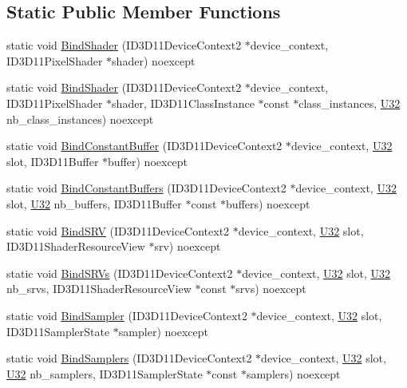 \subsection*{Static Public Member Functions}
\begin{DoxyCompactItemize}
\item 
static void \hyperlink{structmage_1_1_pipeline_1_1_p_s_acd52254650845fa7764bd885b057f911}{Bind\+Shader} (I\+D3\+D11\+Device\+Context2 $\ast$device\+\_\+context, I\+D3\+D11\+Pixel\+Shader $\ast$shader) noexcept
\item 
static void \hyperlink{structmage_1_1_pipeline_1_1_p_s_a7041e2df09132fc997693cd1dc8d02f7}{Bind\+Shader} (I\+D3\+D11\+Device\+Context2 $\ast$device\+\_\+context, I\+D3\+D11\+Pixel\+Shader $\ast$shader, I\+D3\+D11\+Class\+Instance $\ast$const $\ast$class\+\_\+instances, \hyperlink{namespacemage_a41c104c036fba3756a74e19f793eeaa1}{U32} nb\+\_\+class\+\_\+instances) noexcept
\item 
static void \hyperlink{structmage_1_1_pipeline_1_1_p_s_a111b5788abda87b66c81a1dfb6a1cad3}{Bind\+Constant\+Buffer} (I\+D3\+D11\+Device\+Context2 $\ast$device\+\_\+context, \hyperlink{namespacemage_a41c104c036fba3756a74e19f793eeaa1}{U32} slot, I\+D3\+D11\+Buffer $\ast$buffer) noexcept
\item 
static void \hyperlink{structmage_1_1_pipeline_1_1_p_s_aa3a8689b37e565f9796f1a17c3c7917a}{Bind\+Constant\+Buffers} (I\+D3\+D11\+Device\+Context2 $\ast$device\+\_\+context, \hyperlink{namespacemage_a41c104c036fba3756a74e19f793eeaa1}{U32} slot, \hyperlink{namespacemage_a41c104c036fba3756a74e19f793eeaa1}{U32} nb\+\_\+buffers, I\+D3\+D11\+Buffer $\ast$const $\ast$buffers) noexcept
\item 
static void \hyperlink{structmage_1_1_pipeline_1_1_p_s_ad4fa085421da9ccf7374a15f5f0c4b03}{Bind\+S\+RV} (I\+D3\+D11\+Device\+Context2 $\ast$device\+\_\+context, \hyperlink{namespacemage_a41c104c036fba3756a74e19f793eeaa1}{U32} slot, I\+D3\+D11\+Shader\+Resource\+View $\ast$srv) noexcept
\item 
static void \hyperlink{structmage_1_1_pipeline_1_1_p_s_a5e85f354e7f10f5de19e11788be63b68}{Bind\+S\+R\+Vs} (I\+D3\+D11\+Device\+Context2 $\ast$device\+\_\+context, \hyperlink{namespacemage_a41c104c036fba3756a74e19f793eeaa1}{U32} slot, \hyperlink{namespacemage_a41c104c036fba3756a74e19f793eeaa1}{U32} nb\+\_\+srvs, I\+D3\+D11\+Shader\+Resource\+View $\ast$const $\ast$srvs) noexcept
\item 
static void \hyperlink{structmage_1_1_pipeline_1_1_p_s_a9c6e185acc261a3f170ac3ef18ff15d2}{Bind\+Sampler} (I\+D3\+D11\+Device\+Context2 $\ast$device\+\_\+context, \hyperlink{namespacemage_a41c104c036fba3756a74e19f793eeaa1}{U32} slot, I\+D3\+D11\+Sampler\+State $\ast$sampler) noexcept
\item 
static void \hyperlink{structmage_1_1_pipeline_1_1_p_s_aeab07583ff06a7b6b8a260f8e4fa98fb}{Bind\+Samplers} (I\+D3\+D11\+Device\+Context2 $\ast$device\+\_\+context, \hyperlink{namespacemage_a41c104c036fba3756a74e19f793eeaa1}{U32} slot, \hyperlink{namespacemage_a41c104c036fba3756a74e19f793eeaa1}{U32} nb\+\_\+samplers, I\+D3\+D11\+Sampler\+State $\ast$const $\ast$samplers) noexcept
\end{DoxyCompactItemize}
